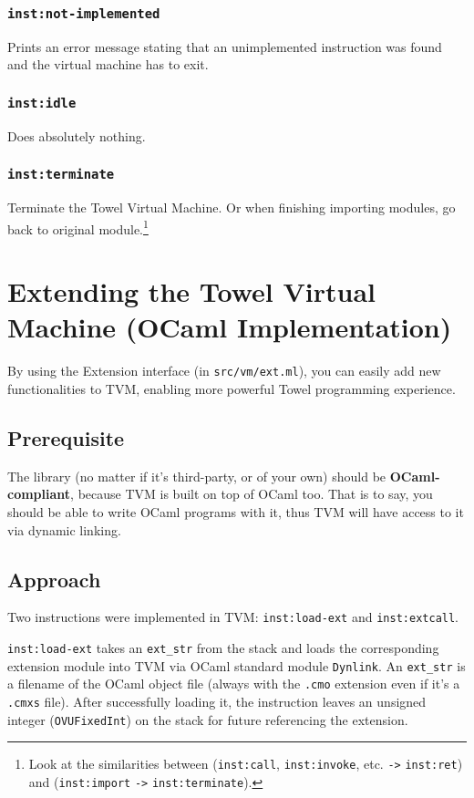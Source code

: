 \documentclass{article}
\newcommand{\inst}[1] {\texttt{inst:#1}}
\begin{document}
\subsubsection{\inst{not-implemented}}

Prints an error message stating that an unimplemented instruction was found and the virtual machine has to exit.

\subsubsection{\inst{idle}}

Does absolutely nothing.

\subsubsection{\inst{terminate}}

Terminate the Towel Virtual Machine. Or when finishing importing modules, go back to original module.\footnote{Look at the similarities between (\inst{call}, \inst{invoke}, etc. \texttt{->} \inst{ret}) and (\inst{import} \texttt{->} \inst{terminate}).}

\section{Extending the Towel Virtual Machine (OCaml Implementation)}

By using the Extension interface (in \texttt{src/vm/ext.ml}), you can easily add new functionalities to TVM, enabling more powerful Towel programming experience.

\subsection{Prerequisite}

The library (no matter if it's third-party, or of your own) should be \textbf{OCaml-compliant}, because TVM is built on top of OCaml too. That is to say, you should be able to write OCaml programs with it, thus TVM will have access to it via dynamic linking.

\subsection{Approach}

Two instructions were implemented in TVM: \inst{load-ext} and \inst{extcall}.

\inst{load-ext} takes an \texttt{ext\_str} from the stack and loads the corresponding extension module into TVM via OCaml standard module \texttt{Dynlink}. An \texttt{ext\_str} is a filename of the OCaml object file (always with the \texttt{.cmo} extension even if it's a \texttt{.cmxs} file). After successfully loading it, the instruction leaves an unsigned integer (\texttt{OVUFixedInt}) on the stack for future referencing the extension.
\end{document}
